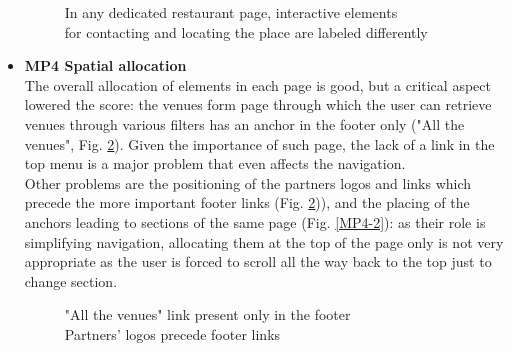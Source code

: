 \begin{itemize}
\begin{figure}[!ht]
\begin{minipage}{\linewidth}
                \captionsetup{justification=centering}
                \caption{In any dedicated restaurant page, interactive elements\\for contacting and locating the place are labeled differently}
                \label{MP3-2}
            \end{minipage}
        \end{figure}
        \pagebreak
    \item \textbf{MP4 Spatial allocation}\\
        The overall allocation of elements in each page is good, but a critical aspect lowered the score: the venues form page through which the user can retrieve venues through various filters has an anchor in the footer only ("All the venues", Fig. \ref{MP4-1}). Given the importance of such page, the lack of a link in the top menu is a major problem that even affects the navigation.\\
        Other problems are the positioning of the partners logos and links which precede the more important footer links (Fig. \ref{MP4-1})), and the placing of the anchors leading to sections of the same page (Fig. \ref{MP4-2}): as their role is simplifying navigation, allocating them at the top of the page only is not very appropriate as the user is forced to scroll all the way back to the top just to change section.
        \begin{figure}[!ht]
            \begin{minipage}{\linewidth}
                \centering
                \captionsetup{justification=centering}
                \caption{"All the venues" link present only in the footer\\Partners' logos precede footer links}
                \label{MP4-1}
            \end{minipage}
        \end{figure}

\end{itemize}
